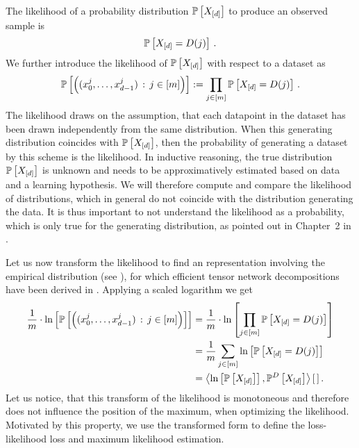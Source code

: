 The likelihood of a probability distribution $\mathbb{P}\left[X_{[d]}\right]$ to produce an observed sample is
\begin{align*}
    \mathbb{P}\left[X_{[d]} = D(j)\right] \, .
\end{align*}
We further introduce the likelihood of $\mathbb{P}\left[X_{[d]}\right]$ with respect to a dataset as
\begin{align*}
    \mathbb{P}\left[\left(({x_{0}^{j},\ldots,x_{d-1}^{j}})\,:\,j\in[m]\right)\right] := \prod_{j\in[m]} \mathbb{P}\left[X_{[d]} = D(j)\right] \, .
\end{align*}
The likelihood draws on the assumption, that each datapoint in the dataset has been drawn independently from the same distribution.
When this generating distribution coincides with $\mathbb{P}\left[X_{[d]}\right]$, then the probability of generating a dataset by this scheme is the likelihood.
In inductive reasoning, the true distribution $\mathbb{P}\left[X_{[d]}\right]$ is unknown and needs to be approximatively estimated based on data and a learning hypothesis.
We will therefore compute and compare the likelihood of distributions, which in general do not coincide with the distribution generating the data.
It is thus important to not understand the likelihood as a probability, which is only true for the generating distribution, as pointed out in Chapter~2 in \cite{mackay_information_2003}.

Let us now transform the likelihood to find an representation involving the empirical distribution (see ), for which efficient tensor network decompositions have been derived in .
Applying a scaled logarithm we get
\begin{align*}
    \frac{1}{m} \cdot \ln \left[ \mathbb{P}\left[\left(({x_{0}^{j},\ldots,x_{d-1}^{j}})\,:\,j\in[m]\right)\right] \right]
    &= \frac{1}{m} \cdot \ln \left[ \prod_{j\in[m]} \mathbb{P}\left[X_{[d]} = D(j)\right] \right] \\
    &= \frac{1}{m}\sum_{j\in[m]} \ln \left[ \mathbb{P}\left[X_{[d]} = D(j)\right] \right] \\
    &= \left\langle \ln \left[ \mathbb{P}\left[X_{[d]}\right] \right],\mathbb{P}^{D}\left[X_{[d]}\right]\right\rangle \left[ \, \right] .
\end{align*}
Let us notice, that this transform of the likelihood is monotoneous and therefore does not influence the position of the maximum, when optimizing the likelihood.
Motivated by this property, we use the transformed form to define the loss-likelihood loss and maximum likelihood estimation.

